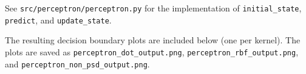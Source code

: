 \begin{answer}
See \texttt{src/perceptron/perceptron.py} for the implementation of \texttt{initial\_state}, \texttt{predict}, and \texttt{update\_state}.

The resulting decision boundary plots are included below (one per kernel). The plots are saved as \texttt{perceptron\_dot\_output.png}, \texttt{perceptron\_rbf\_output.png}, and \texttt{perceptron\_non\_psd\_output.png}.
\end{answer}
